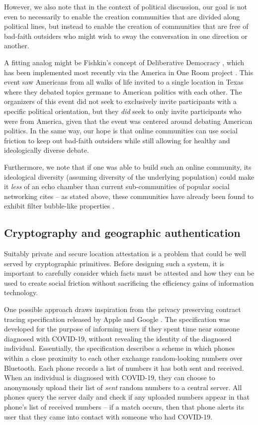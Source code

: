 \documentclass[sigconf,authordraft]{acmart}
\begin{document}
However, we also note that in the context of political discussion, our goal is not even to necessarily to enable the creation communities that are divided along political lines, but instead to enable the creation of communities that are free of bad-faith outsiders who might wish to sway the conversation in one direction or another. 

A fitting analog might be Fishkin's concept of Deliberative Democracy \cite{fishkin1991democracy}, which has been implemented most recently via the America in One Room project \cite{AmericaInOneRoom}. This event saw Americans from all walks of life invited to a single location in Texas where they debated topics germane to American politics with each other. The organizers of this event did not seek to exclusively invite participants with a specific political orientation, but they {\itshape did} seek to only invite participants who were from America, given that the event was centered around debating American politics. In the same way, our hope is that online communities can use social friction to keep out bad-faith outsiders while still allowing for healthy and ideologically diverse debate.

Furthermore, we note that if one was able to build such an online community, its ideological diversity (assuming diversity of the underlying population) could make it {\itshape less} of an echo chamber than current sub-communities of popular social networking cites -- as stated above, these communities have already been found to exhibit filter bubble-like properties \cite{garimella2018political}.

\subsection{Cryptography and geographic authentication}
\label{sec:crypto}

Suitably private and secure location attestation is a problem that could be well served by cryptographic primitives. Before designing such a system, it is important to carefully consider which facts must be attested and how they can be used to create social friction without sacrificing the efficiency gains of information technology.

One possible approach draws inspiration from the privacy preserving contract tracing specification released by Apple and Google \cite{contact_tracing_spec}. The specification was developed for the purpose of informing users if they spent time near someone diagnosed with COVID-19, without revealing the identity of the diagnosed individual. Essentially, the specification describes a scheme in which phones within a close proximity to each other exchange random-looking numbers over Bluetooth. Each phone records a list of numbers it has both sent and received. When an individual is diagnosed with COVID-19, they can choose to anonymously upload their list of {\itshape sent} random numbers to a central server. All phones query the server daily and check if any uploaded numbers appear in that phone's list of received numbers -- if a match occurs, then that phone alerts its user that they came into contact with someone who had COVID-19. 
\end{document}
